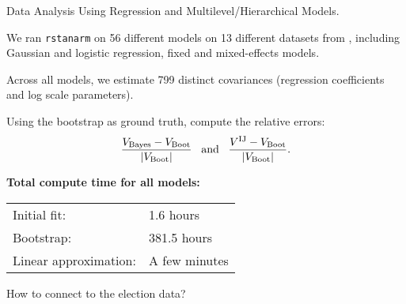 \begin{frame}{Data Analysis Using Regression and Multilevel/Hierarchical Models.}

    \begin{minipage}{0.44\textwidth}
    
    We ran \texttt{rstanarm} on 56 different models on 13 different datasets
    from \citet{gelman:2006:arm},
    including Gaussian and logistic regression, fixed and mixed-effects models.
    
    \spskip Across all models, we estimate 799 distinct covariances (regression
    coefficients and log scale parameters).
    
    \spskip
    Using the bootstrap as ground truth, compute the relative errors:
    \begin{align*}
    \frac{V_{\mathrm{Bayes}} - V_{\mathrm{Boot}}}{|V_{\mathrm{Boot}}|}
    \,\,\,
    \textrm{ and }
    \,\,\,
    \frac{V^{\mathrm{IJ}} - V_{\mathrm{Boot}}}{|V_{\mathrm{Boot}}|}.
    \end{align*}
    \end{minipage}
    \hspace{1em}
    \begin{minipage}{0.44\textwidth}
        \ARMGraphDiff
        \textbf{Total compute time for all models:}
    
        \begin{tabular}{ll}
        Initial fit: & 1.6 hours \\
        Bootstrap: & 381.5 hours\\
        Linear approximation: & A few minutes \\
    \end{tabular}
\end{minipage}

\end{frame}



\begin{frame}[c]{How to connect to the election data?}


\begin{minipage}{0.48\textwidth}
    \ElectionData{}
\end{minipage}
\begin{minipage}{0.48\textwidth}
    \ElectionResultsGlobal{}
\end{minipage}


\end{frame}